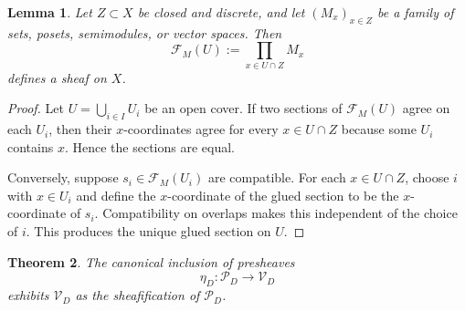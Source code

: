 \documentclass[11pt,a4paper]{article}
\newtheorem{theorem}{Theorem}[section]
\newtheorem{lemma}[theorem]{Lemma}
\theoremstyle{definition}
\theoremstyle{remark}
\newcommand{\cP}{\mathcal P}
\newcommand{\cV}{\mathcal V}
\begin{document}
\begin{lemma}\label{lem:product-sheaf}
Let $Z\subset X$ be closed and discrete, and let $(M_x)_{x\in Z}$ be a family of sets, posets, semimodules, or vector spaces.  Then
\[
\mathcal F_M(U):=\prod_{x\in U\cap Z}M_x
\]
defines a sheaf on $X$.
\end{lemma}

\begin{proof}
Let $U=\bigcup_{i\in I}U_i$ be an open cover.  If two sections of $\mathcal F_M(U)$ agree on each $U_i$, then their $x$-coordinates agree for every $x\in U\cap Z$ because some $U_i$ contains $x$.  Hence the sections are equal.

Conversely, suppose $s_i\in\mathcal F_M(U_i)$ are compatible.  For each $x\in U\cap Z$, choose $i$ with $x\in U_i$ and define the $x$-coordinate of the glued section to be the $x$-coordinate of $s_i$.  Compatibility on overlaps makes this independent of the choice of $i$.  This produces the unique glued section on $U$.
\end{proof}

\begin{theorem}\label{thm:sheafification}
The canonical inclusion of presheaves
\[
\eta_D:\cP_D\longrightarrow \cV_D
\]
exhibits $\cV_D$ as the sheafification of $\cP_D$.
\end{theorem}
\end{document}
